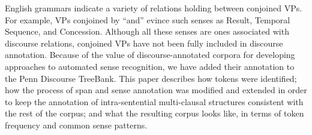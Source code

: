English grammars indicate a variety of relations holding between conjoined VPs. For example, VPs conjoined by ``and'' evince such senses as Result, Temporal Sequence, and Concession. Although all these senses are ones associated with discourse relations, conjoined VPs have not been fully included in discourse annotation. Because of the value of discourse-annotated corpora for developing approaches to automated sense recognition, we have added their annotation to the Penn Discourse TreeBank. This paper describes how tokens were identified; how the process of span and sense annotation was modified and extended in order to keep the annotation of intra-sentential multi-clausal structures consistent with the rest of the corpus; and what the resulting corpus looks like, in terms of token frequency and common sense patterns.
